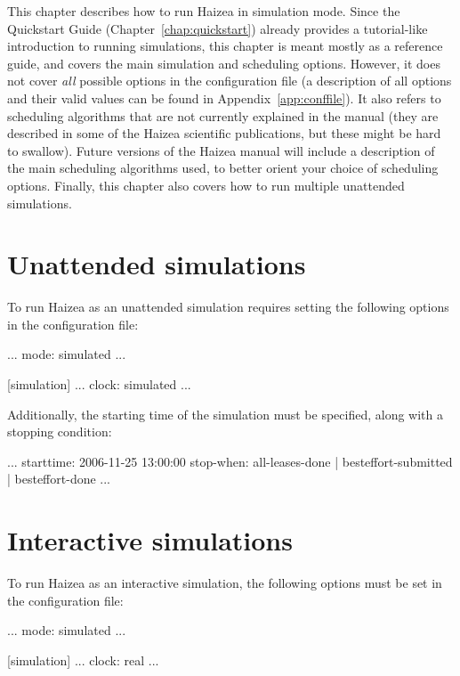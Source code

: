 This chapter describes how to run Haizea in simulation mode. Since the Quickstart Guide (Chapter~\ref{chap:quickstart}) already provides a tutorial-like introduction to running simulations, this chapter is meant mostly as a reference guide, and covers the main simulation and scheduling options. However, it does not cover \emph{all} possible options in the configuration file (a description of all options and their valid values can be found in Appendix~\ref{app:conffile}). It also refers to scheduling algorithms that are not currently explained in the manual (they are described in some of the Haizea scientific publications, but these might be hard to swallow). Future versions of the Haizea manual will include a description of the main scheduling algorithms used, to better orient your choice of scheduling options. Finally, this chapter also covers how to run multiple unattended simulations.

\section{Unattended simulations}

To run Haizea as an unattended simulation requires setting the following options in the configuration file:

\begin{wideshellverbatim}
[general]
...
mode: simulated
...

[simulation]
...
clock: simulated
...
\end{wideshellverbatim}

Additionally, the starting time of the simulation must be specified, along with a stopping condition:

\begin{wideshellverbatim}
[simulation]
...
starttime: 2006-11-25 13:00:00
stop-when: all-leases-done | 
           besteffort-submitted |
           besteffort-done
...
\end{wideshellverbatim}


\section{Interactive simulations}

To run Haizea as an interactive simulation, the following options must be set in the configuration file:

\begin{wideshellverbatim}
[general]
...
mode: simulated
...

[simulation]
...
clock: real
...
\end{wideshellverbatim}


